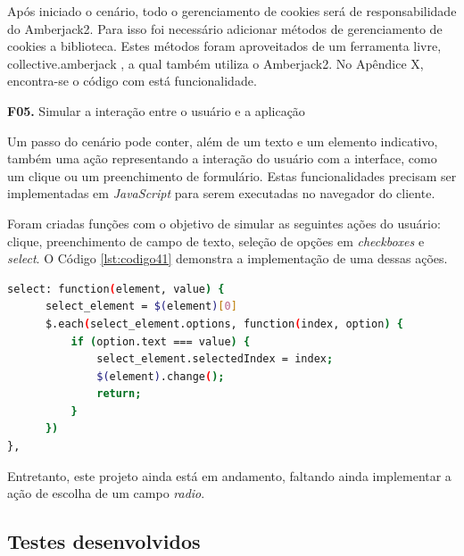 Após iniciado o cenário, todo o gerenciamento de cookies será de responsabilidade do Amberjack2. Para isso foi necessário adicionar métodos de gerenciamento de cookies a biblioteca. Estes métodos foram aproveitados de um ferramenta livre, collective.amberjack \cite{REDTURTLE}, a qual também utiliza o Amberjack2. No Apêndice X, encontra-se o código com está funcionalidade.

\textbf{F05.} Simular a interação entre o usuário e a aplicação

Um passo do cenário pode conter, além de um texto e um elemento indicativo, também uma ação representando a interação do usuário com a interface, como um clique ou um preenchimento de formulário. Estas funcionalidades precisam ser implementadas em \textit{JavaScript} para serem executadas no navegador do cliente.

Foram criadas funções com o objetivo de simular as seguintes ações do usuário: clique, preenchimento de campo de texto, seleção de opções em \textit{checkboxes} e \textit{select}. O Código \ref{lst:codigo41} demonstra a implementação de uma dessas ações.

{\singlespace
\begin{lstlisting}[caption=Função para seleção de item em um \textit{select},language=bash,label={lst:codigo41}]
select: function(element, value) {
      select_element = $(element)[0]
      $.each(select_element.options, function(index, option) {
          if (option.text === value) {
              select_element.selectedIndex = index;
              $(element).change();
              return;
          }
      })
},
\end{lstlisting}
}

Entretanto, este projeto ainda está em andamento, faltando ainda implementar a ação de escolha de um campo \textit{radio}.
























\subsection{Testes desenvolvidos}


